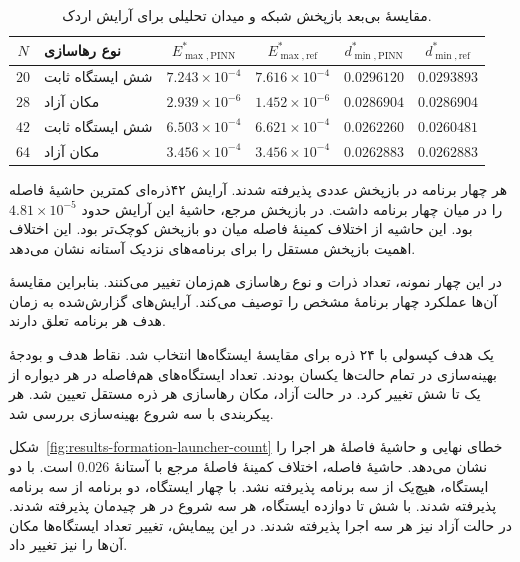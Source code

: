 \begin{table}[htbp]
\centering
\small
\setlength{\tabcolsep}{5pt}
\caption{مقایسهٔ بی‌بعد بازپخش شبکه و میدان تحلیلی برای آرایش اردک.}
\label{tab:results-formation-ducks}
\begin{tabular}{@{}clcccc@{}}
\hline
$N$ & نوع رهاسازی & $E_{\max,\mathrm{PINN}}^*$ & $E_{\max,\mathrm{ref}}^*$
& $d_{\min,\mathrm{PINN}}^*$ & $d_{\min,\mathrm{ref}}^*$ \\
\hline
$20$ & شش ایستگاه ثابت & $7.243\times10^{-4}$ & $7.616\times10^{-4}$ & $0.0296120$ & $0.0293893$ \\
$28$ & مکان آزاد & $2.939\times10^{-6}$ & $1.452\times10^{-6}$ & $0.0286904$ & $0.0286904$ \\
$42$ & شش ایستگاه ثابت & $6.503\times10^{-4}$ & $6.621\times10^{-4}$ & $0.0262260$ & $0.0260481$ \\
$64$ & مکان آزاد & $3.456\times10^{-4}$ & $3.456\times10^{-4}$ & $0.0262883$ & $0.0262883$ \\
\hline
\end{tabular}
\end{table}

هر چهار برنامه در بازپخش عددی پذیرفته شدند.
آرایش ۴۲ذره‌ای کمترین حاشیهٔ فاصله را در میان چهار برنامه داشت.
در بازپخش مرجع، حاشیهٔ این آرایش حدود $4.81\times10^{-5}$ بود.
این حاشیه از اختلاف کمینهٔ فاصله میان دو بازپخش کوچک‌تر بود.
این اختلاف اهمیت بازپخش مستقل را برای برنامه‌های نزدیک آستانه نشان می‌دهد.

\enlargethispage{2\baselineskip}
در این چهار نمونه، تعداد ذرات و نوع رهاسازی هم‌زمان تغییر می‌کنند.
بنابراین مقایسهٔ آن‌ها عملکرد چهار برنامهٔ مشخص را توصیف می‌کند.
آرایش‌های گزارش‌شده به زمان هدف هر برنامه تعلق دارند.

\FloatBarrier
{}
\label{sec:results-formation-launcher-count}

یک هدف کپسولی با ۲۴ ذره برای مقایسهٔ ایستگاه‌ها انتخاب شد.
نقاط هدف و بودجهٔ بهینه‌سازی در تمام حالت‌ها یکسان بودند.
تعداد ایستگاه‌های هم‌فاصله در هر دیواره از یک تا شش تغییر کرد.
در حالت آزاد، مکان رهاسازی هر ذره مستقل تعیین شد.
هر پیکربندی با سه شروع بهینه‌سازی بررسی شد.

شکل~\ref{fig:results-formation-launcher-count} خطای نهایی و حاشیهٔ فاصلهٔ هر اجرا را نشان می‌دهد.
حاشیهٔ فاصله، اختلاف کمینهٔ فاصلهٔ مرجع با آستانهٔ $0.026$ است.
با دو ایستگاه، هیچ‌یک از سه برنامه پذیرفته نشد.
با چهار ایستگاه، دو برنامه از سه برنامه پذیرفته شدند.
با شش تا دوازده ایستگاه، هر سه شروع در هر چیدمان پذیرفته شدند.
در حالت آزاد نیز هر سه اجرا پذیرفته شدند.
در این پیمایش، تغییر تعداد ایستگاه‌ها مکان آن‌ها را نیز تغییر داد.

